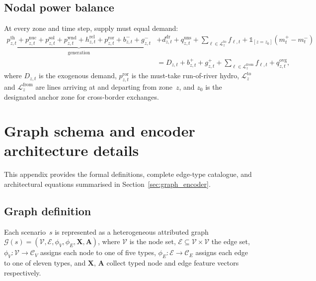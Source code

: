 \documentclass{article}
\begin{document}
\subsection{Nodal power balance}

At every zone and time step, supply must equal demand:
\begin{equation}
\begin{aligned}
\underbrace{p^{\mathrm{th}}_{z,t} + p^{\mathrm{nuc}}_{z,t} + p^{\mathrm{sol}}_{z,t}
+ p^{\mathrm{wnd}}_{z,t} + h^{\mathrm{rel}}_{z,t} + p^{\mathrm{ror}}_{z,t}
+ b^{-}_{z,t} + g^{-}_{z,t}}_{\text{generation}}
&+ d^{\mathrm{dr}}_{z,t} + q^{\mathrm{uns}}_{z,t}
+ \!\!\sum_{\ell \in \mathcal{L}^{\mathrm{to}}_z}\!\! f_{\ell,t}
+ \mathbb{1}_{[z=z_0]}(m^{+}_{t} - m^{-}_{t}) \\
&= D_{z,t} + b^{+}_{z,t} + g^{+}_{z,t}
+ \!\!\sum_{\ell \in \mathcal{L}^{\mathrm{from}}_z}\!\! f_{\ell,t}
+ q^{\mathrm{ovg}}_{z,t},
\end{aligned}
\label{eq:power_balance}
\end{equation}
where $D_{z,t}$ is the exogenous demand, $p^{\mathrm{ror}}_{z,t}$ is the must-take run-of-river hydro, $\mathcal{L}^{\mathrm{to}}_z$ and $\mathcal{L}^{\mathrm{from}}_z$ are lines arriving at and departing from zone~$z$, and $z_0$ is the designated anchor zone for cross-border exchanges.



\section{Graph schema and encoder architecture details}
\label{app:graph_hte_details}

This appendix provides the formal definitions, complete edge-type catalogue, and architectural equations summarised in Section~\ref{sec:graph_encoder}.

\subsection{Graph definition}
\label{app:graph_schema}

Each scenario~$s$ is represented as a heterogeneous attributed graph
$\mathcal{G}(s) = (\mathcal{V}, \mathcal{E}, \phi_V, \phi_E, \mathbf{X}, \mathbf{A})$,
where $\mathcal{V}$ is the node set, $\mathcal{E} \subseteq \mathcal{V} \times \mathcal{V}$ the edge set, $\phi_V : \mathcal{V} \to \mathcal{C}_V$ assigns each node to one of five types, $\phi_E : \mathcal{E} \to \mathcal{C}_E$ assigns each edge to one of eleven types, and $\mathbf{X}$, $\mathbf{A}$ collect typed node and edge feature vectors respectively.
\end{document}

